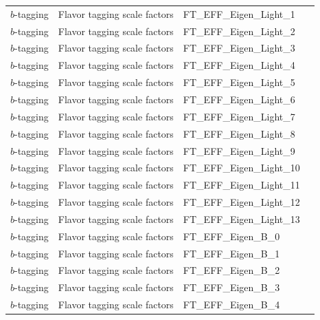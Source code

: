 \begin{table}[h]
\begin{center}
\begin{tabular}{|l|l|l|l|}
$b$-tagging     & Flavor tagging scale factors    &    FT\_EFF\_Eigen\_Light\_1                               \\
$b$-tagging     & Flavor tagging scale factors    &    FT\_EFF\_Eigen\_Light\_2                               \\
$b$-tagging     & Flavor tagging scale factors    &    FT\_EFF\_Eigen\_Light\_3                               \\
$b$-tagging     & Flavor tagging scale factors    &    FT\_EFF\_Eigen\_Light\_4                               \\
$b$-tagging     & Flavor tagging scale factors    &    FT\_EFF\_Eigen\_Light\_5                               \\
$b$-tagging     & Flavor tagging scale factors    &    FT\_EFF\_Eigen\_Light\_6                               \\
$b$-tagging     & Flavor tagging scale factors    &    FT\_EFF\_Eigen\_Light\_7                               \\
$b$-tagging     & Flavor tagging scale factors    &    FT\_EFF\_Eigen\_Light\_8                               \\
$b$-tagging     & Flavor tagging scale factors    &    FT\_EFF\_Eigen\_Light\_9                               \\
$b$-tagging     & Flavor tagging scale factors    &    FT\_EFF\_Eigen\_Light\_10                             \\
$b$-tagging     & Flavor tagging scale factors    &    FT\_EFF\_Eigen\_Light\_11                             \\
$b$-tagging     & Flavor tagging scale factors    &    FT\_EFF\_Eigen\_Light\_12                             \\
$b$-tagging     & Flavor tagging scale factors    &    FT\_EFF\_Eigen\_Light\_13                             \\
$b$-tagging     & Flavor tagging scale factors    &    FT\_EFF\_Eigen\_B\_0                               \\
$b$-tagging     & Flavor tagging scale factors    &    FT\_EFF\_Eigen\_B\_1                               \\
$b$-tagging     & Flavor tagging scale factors    &    FT\_EFF\_Eigen\_B\_2                               \\
$b$-tagging     & Flavor tagging scale factors    &    FT\_EFF\_Eigen\_B\_3                               \\
$b$-tagging     & Flavor tagging scale factors    &    FT\_EFF\_Eigen\_B\_4                               \\

\end{tabular}
\end{center}
\end{table}
